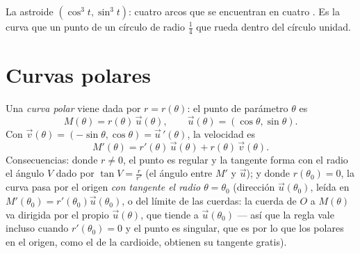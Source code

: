 \begin{omfigure}

{\small La astroide $(\cos^3 t, \sin^3 t)$: cuatro arcos que se
encuentran en cuatro . Es la curva que  un
punto de un círculo de radio $\frac14$ que rueda dentro del círculo
unidad.}
\end{omfigure}

\section{Curvas polares}

\begin{definition}\label{def:b1:curves:polar}
Una \emph{curva polar} viene dada por
$r = r(\theta)$: el punto de parámetro $\theta$ es
\[
M(\theta) = r(\theta)\,\vec u(\theta),
\qquad \vec u(\theta) = (\cos\theta, \sin\theta).
\]
Con $\vec v(\theta) = (-\sin\theta, \cos\theta) = \vec
u\,'(\theta)$, la velocidad es
\[
M'(\theta) = r'(\theta)\, \vec u(\theta) + r(\theta)\, \vec
v(\theta) .
\]
Consecuencias: donde $r \neq 0$, el punto es regular y la tangente
forma con el radio el ángulo $V$ dado por $\tan V = \frac{r}{r'}$ (el
ángulo entre $M'$ y $\vec u$); y donde $r(\theta_0) = 0$, la curva
pasa por el origen \emph{con tangente el radio $\theta = \theta_0$}
(dirección $\vec u(\theta_0)$, leída en
$M'(\theta_0) = r'(\theta_0)\vec u(\theta_0)$, o del límite de las
cuerdas: la cuerda de $O$ a $M(\theta)$ va dirigida por el propio
$\vec u(\theta)$, que tiende a $\vec u(\theta_0)$ --- así que la
regla vale incluso cuando $r'(\theta_0) = 0$ y el punto es singular,
que es por lo que los  polares en el origen, como
el de la cardioide, obtienen su tangente gratis).
\end{definition}

